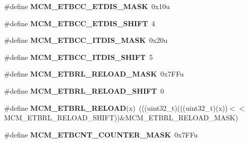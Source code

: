 \begin{DoxyCompactItemize}
\item 
\#define {\bfseries M\+C\+M\+\_\+\+E\+T\+B\+C\+C\+\_\+\+E\+T\+D\+I\+S\+\_\+\+M\+A\+SK}~0x10u\hypertarget{group__MCM__Register__Masks_ga4e65e76bc2ffbd1a4577fb31da7e5fbb}{}\label{group__MCM__Register__Masks_ga4e65e76bc2ffbd1a4577fb31da7e5fbb}

\item 
\#define {\bfseries M\+C\+M\+\_\+\+E\+T\+B\+C\+C\+\_\+\+E\+T\+D\+I\+S\+\_\+\+S\+H\+I\+FT}~4\hypertarget{group__MCM__Register__Masks_ga40fefdc2fb703f686abf76fda0ec6859}{}\label{group__MCM__Register__Masks_ga40fefdc2fb703f686abf76fda0ec6859}

\item 
\#define {\bfseries M\+C\+M\+\_\+\+E\+T\+B\+C\+C\+\_\+\+I\+T\+D\+I\+S\+\_\+\+M\+A\+SK}~0x20u\hypertarget{group__MCM__Register__Masks_ga390a11a02383ea3369843438b3a5ff80}{}\label{group__MCM__Register__Masks_ga390a11a02383ea3369843438b3a5ff80}

\item 
\#define {\bfseries M\+C\+M\+\_\+\+E\+T\+B\+C\+C\+\_\+\+I\+T\+D\+I\+S\+\_\+\+S\+H\+I\+FT}~5\hypertarget{group__MCM__Register__Masks_ga92bf57df9f719917686203be01c3d141}{}\label{group__MCM__Register__Masks_ga92bf57df9f719917686203be01c3d141}

\item 
\#define {\bfseries M\+C\+M\+\_\+\+E\+T\+B\+R\+L\+\_\+\+R\+E\+L\+O\+A\+D\+\_\+\+M\+A\+SK}~0x7\+F\+Fu\hypertarget{group__MCM__Register__Masks_gab63bbd758727921d1744034311a25c81}{}\label{group__MCM__Register__Masks_gab63bbd758727921d1744034311a25c81}

\item 
\#define {\bfseries M\+C\+M\+\_\+\+E\+T\+B\+R\+L\+\_\+\+R\+E\+L\+O\+A\+D\+\_\+\+S\+H\+I\+FT}~0\hypertarget{group__MCM__Register__Masks_ga04c87446d72a2644f3ee4d493f5febba}{}\label{group__MCM__Register__Masks_ga04c87446d72a2644f3ee4d493f5febba}

\item 
\#define {\bfseries M\+C\+M\+\_\+\+E\+T\+B\+R\+L\+\_\+\+R\+E\+L\+O\+AD}(x)~(((uint32\+\_\+t)(((uint32\+\_\+t)(x))$<$$<$M\+C\+M\+\_\+\+E\+T\+B\+R\+L\+\_\+\+R\+E\+L\+O\+A\+D\+\_\+\+S\+H\+I\+FT))\&M\+C\+M\+\_\+\+E\+T\+B\+R\+L\+\_\+\+R\+E\+L\+O\+A\+D\+\_\+\+M\+A\+SK)\hypertarget{group__MCM__Register__Masks_ga3aa435178b25a3eb59fa4c76c4276fa4}{}\label{group__MCM__Register__Masks_ga3aa435178b25a3eb59fa4c76c4276fa4}

\item 
\#define {\bfseries M\+C\+M\+\_\+\+E\+T\+B\+C\+N\+T\+\_\+\+C\+O\+U\+N\+T\+E\+R\+\_\+\+M\+A\+SK}~0x7\+F\+Fu\hypertarget{group__MCM__Register__Masks_ga0ad096c8133f83aad1812ed0263a47a7}{}\label{group__MCM__Register__Masks_ga0ad096c8133f83aad1812ed0263a47a7}


\end{DoxyCompactItemize}
